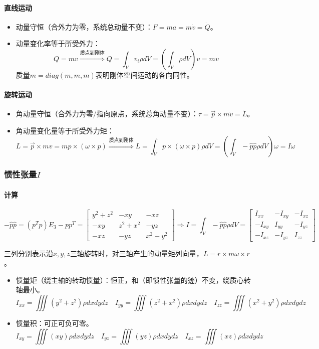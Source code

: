\documentclass[
12pt, %
a4paper, 
oneside, %
headinclude,footinclude, %
]{scrartcl}
\begin{document}
\paragraph{直线运动}
\begin{itemize}
\item 动量守恒（合外力为零，系统总动量不变）：$ F = ma = m\dot{v} = \dot{Q} $。
\item 动量变化率等于所受外力：
$$ 
Q = mv
\overset{\text{质点到刚体}}{\Longrightarrow}
Q = \int_V v_i \rho dV = (\int_V \rho dV) v = mv
$$
质量$ m = diag(m,m,m) $表明刚体空间运动的各向同性。
\end{itemize} 
\paragraph{旋转运动}
\begin{itemize}
\item 角动量守恒（合外力为零/指向原点，系统总角动量不变）：$ \tau = \vec{p} \times m\dot{v} = \dot{L} $。
\item 角动量变化量等于所受外力矩：
$$ 
L = \vec{p} \times mv = mp \times (\omega \times p)
\overset{\text{质点到刚体}}{\Longrightarrow}
L = \int_V p \times (\omega \times p) \rho dV = (\int_V -\hat{p}\hat{p}\rho dV) \omega = I\omega 
$$
\end{itemize} 
\subsubsection[惯性张量]{惯性张量$ I $}
\paragraph{计算}
$$
-\hat{p}\hat{p} = (p^Tp)E_3 - pp^T = \begin{bmatrix} y^2 + z^2 & -xy & -xz \\ -xy & z^2 + x^2 & -yz \\ -xz & -yz & x^2 + y^2 \end{bmatrix}
\Rightarrow
I = \int_V -\hat{p}\hat{p}\rho dV = \begin{bmatrix} I_{xx} & -I_{xy} & -I_{xz} \\ -I_{xy} & I_{yy} & -I_{yz} \\ -I_{xz} & -I_{yz} & I_{zz} \end{bmatrix}
$$

三列分别表示沿$ x,y,z $三轴旋转时，对三轴产生的动量矩列向量，$ L = r \times m \omega \times r $。
\begin{itemize}
\item 惯量矩（绕主轴的转动惯量）：恒正，和（即惯性张量的迹）不变，绕质心转轴最小。
$$ I_{xx} = \iiint (y^2 + z^2)\rho dxdydz \quad I_{yy} = \iiint (z^2 + x^2)\rho dxdydz \quad I_{zz} = \iiint (x^2 + y^2)\rho dxdydz $$
\item 惯量积：可正可负可零。
$$ I_{xy} = \iiint (xy)\rho dxdydz \quad I_{yz} = \iiint (yz)\rho dxdydz \quad I_{xz} = \iiint (xz)\rho dxdydz $$
\end{itemize} 
\end{document}
